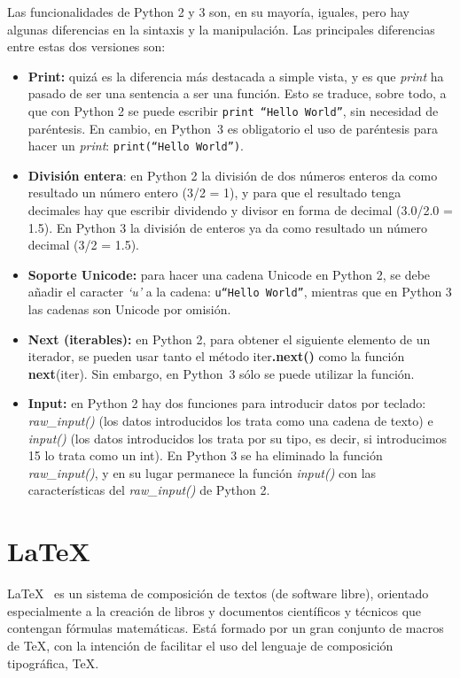 \documentclass[a4paper, 12pt]{book}
\begin{document}
Las funcionalidades de Python 2 y 3 son, en su mayoría, iguales, pero hay algunas diferencias en la sintaxis y la manipulación. Las principales diferencias entre estas dos versiones son:
\begin{itemize}
	\item \textbf{Print:} quizá es la diferencia más destacada a simple vista, y es que \textit{print} ha pasado de ser una sentencia a ser una función. Esto se traduce, sobre todo, a que con Python 2 se puede escribir \texttt{print ``Hello World''}, sin necesidad de paréntesis. En cambio, en Python~3 es obligatorio el uso de paréntesis para hacer un \textit{print}: \texttt{print(``Hello World'')}.
	\item \textbf{División entera}: en Python 2 la división de dos números enteros da como resultado un número entero (3/2 = 1), y para que el resultado tenga decimales hay que escribir dividendo y divisor en forma de decimal (3.0/2.0 = 1.5). En Python 3 la división de enteros ya da como resultado un número decimal (3/2 = 1.5).
	\item \textbf{Soporte Unicode:} para hacer una cadena Unicode en Python 2, se debe añadir el caracter \textit{`u'} a la cadena: \texttt{u``Hello World''}, mientras que en Python 3 las cadenas son Unicode por omisión.
	\item \textbf{Next (iterables):} en Python 2, para obtener el siguiente elemento de un iterador, se pueden usar tanto el método iter\textbf{.next()} como la función \textbf{next}(iter). Sin embargo, en Python~3 sólo se puede utilizar la función.
	\item \textbf{Input:} en Python 2 hay dos funciones para introducir datos por teclado: \textit{raw\_input()} (los datos introducidos los trata como una cadena de texto) e \textit{input()} (los datos introducidos los trata por su tipo, es decir, si introducimos 15 lo trata como un int). En Python 3 se ha eliminado la función \textit{raw\_input()}, y en su lugar permanece la función \textit{input()} con las características del \textit{raw\_input()} de Python 2.
\end{itemize}



\section{\LaTeX}
\label{sec:latex}
\LaTeX~\cite{latex:1} es un sistema de composición de textos (de software libre), orientado especialmente a la creación de libros y documentos científicos y técnicos que contengan fórmulas matemáticas. Está formado por un gran conjunto de macros de \TeX, con la intención de facilitar el uso del lenguaje de composición tipográfica, \TeX.\\
\end{document}
